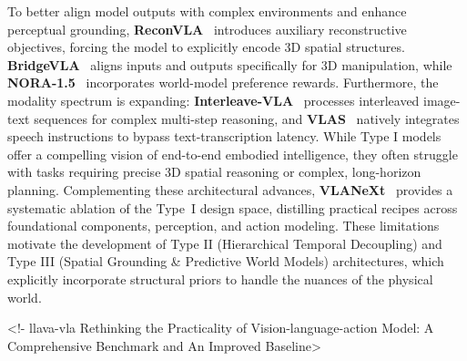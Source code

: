\documentclass[acmsmall,screen,review,anonymous]{acmart}
\begin{document}
To better align model outputs with complex environments and enhance perceptual grounding, \textbf{ReconVLA}~\cite{song2025reconvla} introduces auxiliary reconstructive objectives, forcing the model to explicitly encode 3D spatial structures. \textbf{BridgeVLA}~\cite{li2025bridgevla} aligns inputs and outputs specifically for 3D manipulation, while \textbf{NORA-1.5}~\cite{hung2025nora15} incorporates world-model preference rewards. Furthermore, the modality spectrum is expanding: \textbf{Interleave-VLA}~\cite{fan2026interleave} processes interleaved image-text sequences for complex multi-step reasoning, and \textbf{VLAS}~\cite{zhao2025vlas} natively integrates speech instructions to bypass text-transcription latency. While Type I models offer a compelling vision of end-to-end embodied intelligence, they often struggle with tasks requiring precise 3D spatial reasoning or complex, long-horizon planning. Complementing these architectural advances, \textbf{VLANeXt}~\cite{wu2026vlanext} provides a systematic ablation of the Type~I design space, distilling practical recipes across foundational components, perception, and action modeling. These limitations motivate the development of Type II (Hierarchical Temporal Decoupling) and Type III (Spatial Grounding \& Predictive World Models) architectures, which explicitly incorporate structural priors to handle the nuances of the physical world.


<!- llava-vla Rethinking the Practicality of Vision-language-action Model: A Comprehensive Benchmark and An Improved Baseline>
\end{document}
